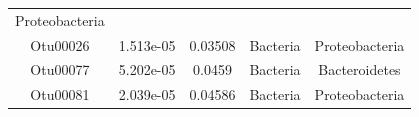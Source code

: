 \documentclass[]{article}
\begin{document}
\begin{longtable}[]{@{}ccccc@{}}
\begin{minipage}[t]{0.19\columnwidth}
Proteobacteria\strut
\end{minipage}\tabularnewline
\begin{minipage}[t]{0.13\columnwidth}\centering\strut
Otu00026\strut
\end{minipage} & \begin{minipage}[t]{0.14\columnwidth}\centering\strut
1.513e-05\strut
\end{minipage} & \begin{minipage}[t]{0.12\columnwidth}\centering\strut
0.03508\strut
\end{minipage} & \begin{minipage}[t]{0.13\columnwidth}\centering\strut
Bacteria\strut
\end{minipage} & \begin{minipage}[t]{0.19\columnwidth}\centering\strut
Proteobacteria\strut
\end{minipage}\tabularnewline
\begin{minipage}[t]{0.13\columnwidth}\centering\strut
Otu00077\strut
\end{minipage} & \begin{minipage}[t]{0.14\columnwidth}\centering\strut
5.202e-05\strut
\end{minipage} & \begin{minipage}[t]{0.12\columnwidth}\centering\strut
0.0459\strut
\end{minipage} & \begin{minipage}[t]{0.13\columnwidth}\centering\strut
Bacteria\strut
\end{minipage} & \begin{minipage}[t]{0.19\columnwidth}\centering\strut
Bacteroidetes\strut
\end{minipage}\tabularnewline
\begin{minipage}[t]{0.13\columnwidth}\centering\strut
Otu00081\strut
\end{minipage} & \begin{minipage}[t]{0.14\columnwidth}\centering\strut
2.039e-05\strut
\end{minipage} & \begin{minipage}[t]{0.12\columnwidth}\centering\strut
0.04586\strut
\end{minipage} & \begin{minipage}[t]{0.13\columnwidth}\centering\strut
Bacteria\strut
\end{minipage} & \begin{minipage}[t]{0.19\columnwidth}\centering\strut
Proteobacteria\strut
\end{minipage}\tabularnewline

\end{longtable}
\end{document}
